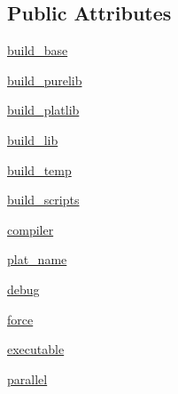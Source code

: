 \subsection*{Public Attributes}
\begin{DoxyCompactItemize}
\item 
\hyperlink{classsetuptools_1_1__distutils_1_1command_1_1build_1_1build_a0642eeed332189eeafdbcf3c6e5a9416}{build\+\_\+base}
\item 
\hyperlink{classsetuptools_1_1__distutils_1_1command_1_1build_1_1build_a133953bd3d6d78667c9faa943f999ce3}{build\+\_\+purelib}
\item 
\hyperlink{classsetuptools_1_1__distutils_1_1command_1_1build_1_1build_a777e2a35205d6a235953b74db38334ca}{build\+\_\+platlib}
\item 
\hyperlink{classsetuptools_1_1__distutils_1_1command_1_1build_1_1build_a8aca019a53d949918f4acb9ab65a4a9b}{build\+\_\+lib}
\item 
\hyperlink{classsetuptools_1_1__distutils_1_1command_1_1build_1_1build_a7c9def59d96fc16ceeac9b017457bd77}{build\+\_\+temp}
\item 
\hyperlink{classsetuptools_1_1__distutils_1_1command_1_1build_1_1build_afdac316cc17a23ae2a3f5fbebc7c0526}{build\+\_\+scripts}
\item 
\hyperlink{classsetuptools_1_1__distutils_1_1command_1_1build_1_1build_a6c6fd9d132233bf9f90b3ae41e297a6c}{compiler}
\item 
\hyperlink{classsetuptools_1_1__distutils_1_1command_1_1build_1_1build_af6ee6f1a757768235bee406281dde75a}{plat\+\_\+name}
\item 
\hyperlink{classsetuptools_1_1__distutils_1_1command_1_1build_1_1build_ad15d3b29465e7083d9be392ef54ff0a2}{debug}
\item 
\hyperlink{classsetuptools_1_1__distutils_1_1command_1_1build_1_1build_a15873d598ac9ab6ae67d049549888861}{force}
\item 
\hyperlink{classsetuptools_1_1__distutils_1_1command_1_1build_1_1build_a67befede2e2ba7ddd1ae1f848e1f9796}{executable}
\item 
\hyperlink{classsetuptools_1_1__distutils_1_1command_1_1build_1_1build_a80cd47eb32d8e711e289317c54788cb0}{parallel}
\end{DoxyCompactItemize}
